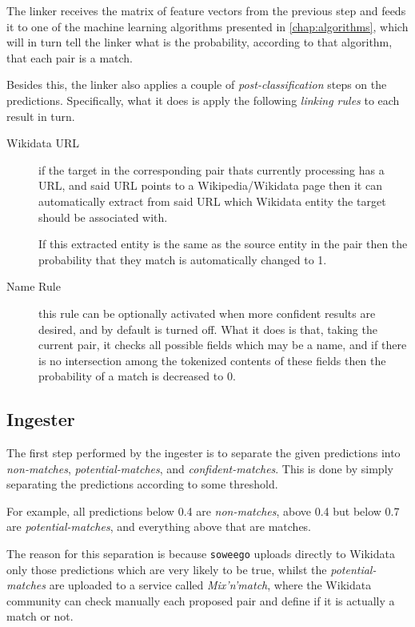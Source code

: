 \documentclass[epsfig,a4paper,11pt,titlepage,twoside,openany]{book}
\begin{document}
The linker receives the matrix of feature vectors from the previous step and feeds it to one of the machine learning algorithms presented in \autoref{chap:algorithms}, which will in turn tell the linker what is the probability, according to that algorithm, that each pair is a match.

Besides this, the linker also applies a couple of \textit{post-classification} steps on the predictions. Specifically, what it does is apply the following \textit{linking rules} to each result in turn.

\begin{description}
\item[Wikidata URL] if the target in the corresponding pair thats currently processing has a URL, and said URL points to a Wikipedia/Wikidata page then it can automatically extract from said URL which Wikidata entity the target should be associated with. 

If this extracted entity is the same as the source entity in the pair then the probability that they match is automatically changed to 1. 

\item[Name Rule] this rule can be optionally activated when more confident results are desired, and by default is turned off. What it does is that, taking the current pair, it checks all possible fields which may be a name, and if there is no intersection among the tokenized contents of these fields then the probability of a match is decreased to 0.
\end{description}



\subsection{Ingester}
\label{sec:soweego-st-ingester}

The first step performed by the ingester is to separate the given predictions into \textit{non-matches}, \textit{potential-matches}, and \textit{confident-matches}. This is done by simply separating the predictions according to some threshold. 



For example, all predictions below 0.4 are \textit{non-matches}, above 0.4 but below 0.7 are \textit{potential-matches}, and everything above that are matches. 


The reason for this separation is because \texttt{soweego} uploads directly to Wikidata only those predictions which are very likely to be true, whilst the \textit{potential-matches} are uploaded to a service called \textit{Mix'n'match}, where the Wikidata community can check manually each proposed pair and define if it is actually a match or not.
\end{document}
